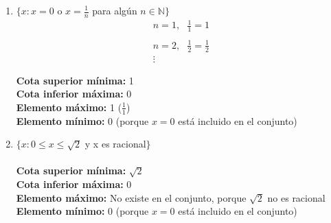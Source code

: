 \documentclass[12pt]{article}
\begin{document}
\begin{enumerate}[label=\textit{\roman*})]
    \textbf{Cota superior mínima:} 1  \\
    \textbf{Cota inferior máxima:} -1 \\
    \textbf{Elemento máximo:} 1 \\
    \textbf{Elemento mínimo:} -1 \\


    \item $\{x : x = 0$ o $x = \frac{1}{n}$ para algún $n \in \mathbb{N}\}$ \\
        \begin{align*}
            n= 1,\, \, \, \, \frac{1}{1} = 1 \\ \\
            n= 2,\, \, \, \, \frac{1}{2} = \frac{1}{2} \\ 
            \vdots
        \end{align*}

    \textbf{Cota superior mínima:} 1  \\
    \textbf{Cota inferior máxima:} 0 \\
    \textbf{Elemento máximo:} 1 ($\frac{1}{1}$)\\
    \textbf{Elemento mínimo:} 0 (porque $x = 0$ está incluido en el conjunto)\\


    \item $\{x : 0 \leq x \leq \sqrt{2}$ y x es racional$\}$ \\ \\
    \textbf{Cota superior mínima:} $\sqrt{2}$  \\
    \textbf{Cota inferior máxima:} 0 \\
    \textbf{Elemento máximo:} No existe en el conjunto, porque $\sqrt{2}$ no es racional\\
    \textbf{Elemento mínimo:} 0 (porque $x = 0$ está incluido en el conjunto)\\

        \newpage


\end{enumerate}
\end{document}

